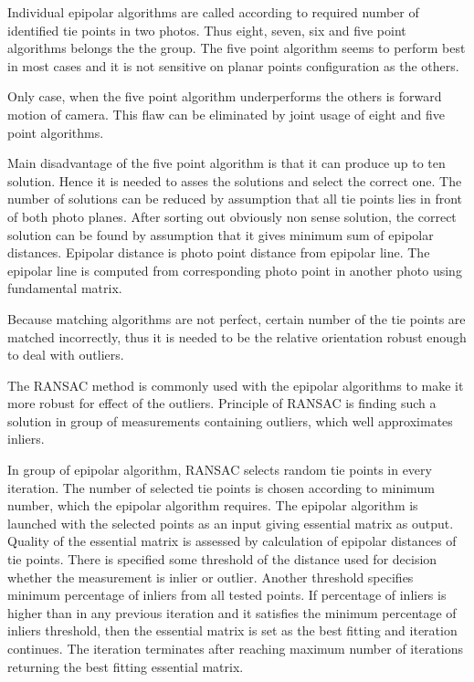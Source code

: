 \documentclass[a4paper,12pt]{article}
\begin{document}



Individual epipolar algorithms are  called 
according to required number of identified tie points in two photos. Thus eight, seven, six and five point
algorithms belongs the the group. 
  The five point algorithm seems to perform best in most
cases \cite{stewenius2006recent} and it is not sensitive on planar points configuration as the others.

Only case, when the five point algorithm \cite{nister2004efficient} underperforms 
\cite{bruckner2008experimental} the others is forward motion of camera.
This flaw can be eliminated by joint usage of eight and five point algorithms.

Main disadvantage of the five point algorithm is that it can produce up to ten solution.
Hence it is needed to asses the solutions and select the correct one. The number of solutions
can be reduced by assumption that all tie points lies in front of both photo 
planes. After sorting out obviously non sense solution,
 the correct solution can be found by assumption that it gives minimum sum of epipolar distances.
 Epipolar distance is photo point distance
 from epipolar line. The epipolar line is computed from corresponding photo point 
 in another photo using fundamental matrix.
  
Because matching algorithms are not perfect, certain number of the tie points are matched 
incorrectly, thus it is needed to be the relative orientation robust enough to
deal with outliers.

The RANSAC \cite{wiki:RANSAC} method is commonly used with the epipolar algorithms to 
make it more robust for effect of the outliers.
Principle of RANSAC is finding such  a solution in group of measurements containing outliers, 
which well approximates inliers.  

In group of epipolar algorithm, RANSAC selects random tie points in every iteration.
The number of selected tie points is chosen according to minimum number, which the epipolar algorithm requires.
The epipolar algorithm is launched with the selected points as an input giving essential matrix
as output. 
Quality of the essential matrix is assessed by 
calculation of epipolar distances of tie points. There is specified some threshold of the distance used 
for decision whether the measurement is inlier or outlier. Another threshold specifies
 minimum percentage of inliers from all tested points. If percentage of inliers is higher than in any previous iteration
and it satisfies the minimum percentage of inliers threshold, then
the essential matrix is set as the best fitting and iteration continues. The iteration terminates after 
reaching maximum number of iterations returning the best fitting essential matrix.
\end{document}
